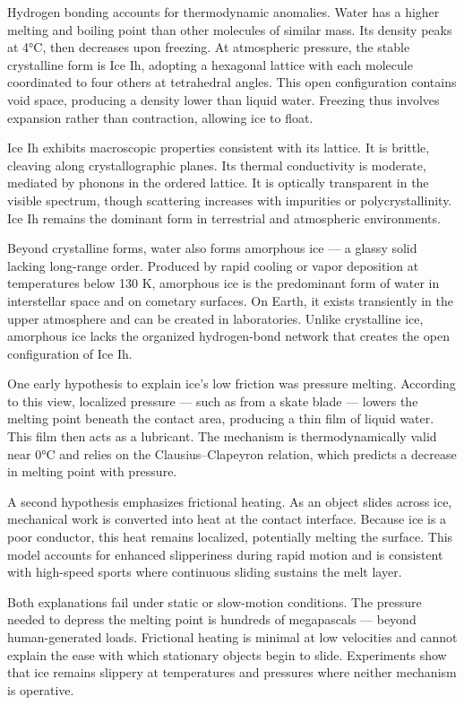 Hydrogen bonding accounts for thermodynamic anomalies. Water has a higher melting and boiling point than other molecules of similar mass. Its density peaks at 4°C, then decreases upon freezing. At atmospheric pressure, the stable crystalline form is Ice Ih, adopting a hexagonal lattice with each molecule coordinated to four others at tetrahedral angles. This open configuration contains void space, producing a density lower than liquid water. Freezing thus involves expansion rather than contraction, allowing ice to float.

Ice Ih exhibits macroscopic properties consistent with its lattice. It is brittle, cleaving along crystallographic planes. Its thermal conductivity is moderate, mediated by phonons in the ordered lattice. It is optically transparent in the visible spectrum, though scattering increases with impurities or polycrystallinity. Ice Ih remains the dominant form in terrestrial and atmospheric environments.

Beyond crystalline forms, water also forms amorphous ice — a glassy solid lacking long-range order. Produced by rapid cooling or vapor deposition at temperatures below 130 K, amorphous ice is the predominant form of water in interstellar space and on cometary surfaces. On Earth, it exists transiently in the upper atmosphere and can be created in laboratories. Unlike crystalline ice, amorphous ice lacks the organized hydrogen-bond network that creates the open configuration of Ice Ih.

One early hypothesis to explain ice's low friction was pressure melting. According to this view, localized pressure — such as from a skate blade — lowers the melting point beneath the contact area, producing a thin film of liquid water. This film then acts as a lubricant. The mechanism is thermodynamically valid near 0°C and relies on the Clausius–Clapeyron relation, which predicts a decrease in melting point with pressure.

A second hypothesis emphasizes frictional heating. As an object slides across ice, mechanical work is converted into heat at the contact interface. Because ice is a poor conductor, this heat remains localized, potentially melting the surface. This model accounts for enhanced slipperiness during rapid motion and is consistent with high-speed sports where continuous sliding sustains the melt layer.

Both explanations fail under static or slow-motion conditions. The pressure needed to depress the melting point is hundreds of megapascals — beyond human-generated loads. Frictional heating is minimal at low velocities and cannot explain the ease with which stationary objects begin to slide. Experiments show that ice remains slippery at temperatures and pressures where neither mechanism is operative.

